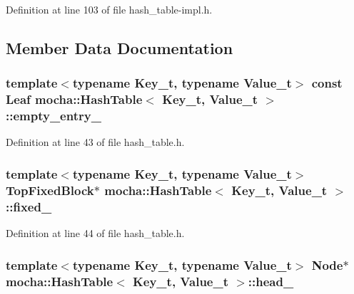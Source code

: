 Definition at line 103 of file hash\_\-table-\/impl.h.



\subsection{Member Data Documentation}
\hypertarget{classmocha_1_1_hash_table_a1d1bc15084515db8f2cb0d792929214f}{
\subsubsection[{empty\_\-entry\_\-}]{\setlength{\rightskip}{0pt plus 5cm}template$<$typename Key\_\-t, typename Value\_\-t$>$ const {\bf Leaf} {\bf mocha::HashTable}$<$ Key\_\-t, Value\_\-t $>$::{\bf empty\_\-entry\_\-}}}
\label{classmocha_1_1_hash_table_a1d1bc15084515db8f2cb0d792929214f}


Definition at line 43 of file hash\_\-table.h.

\hypertarget{classmocha_1_1_hash_table_a6cbe7e08011b4a51fb42828709702e66}{
\subsubsection[{fixed\_\-}]{\setlength{\rightskip}{0pt plus 5cm}template$<$typename Key\_\-t, typename Value\_\-t$>$ {\bf TopFixedBlock}$\ast$ {\bf mocha::HashTable}$<$ Key\_\-t, Value\_\-t $>$::{\bf fixed\_\-}}}
\label{classmocha_1_1_hash_table_a6cbe7e08011b4a51fb42828709702e66}


Definition at line 44 of file hash\_\-table.h.

\hypertarget{classmocha_1_1_hash_table_a954f7023e83b9b52affc3655c67a450c}{
\subsubsection[{head\_\-}]{\setlength{\rightskip}{0pt plus 5cm}template$<$typename Key\_\-t, typename Value\_\-t$>$ {\bf Node}$\ast$ {\bf mocha::HashTable}$<$ Key\_\-t, Value\_\-t $>$::{\bf head\_\-}}}
\label{classmocha_1_1_hash_table_a954f7023e83b9b52affc3655c67a450c}



